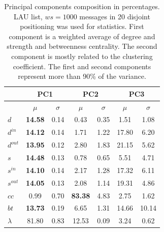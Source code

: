 \documentclass[%
 aip,
 jmp,%
 amsmath,amssymb,
 reprint,%
]{revtex4-1}
\begin{document}
\begin{table}[!h]
  \centering
  \caption{Principal components composition in percentages. LAU list, $ws=1000$ messages in 20 disjoint positioning was used for statistics. First component is a weighted average of degree and strength and betweenness centrality. The second component is mostly related to the  clustering coefficient. The first and second components represent more than 90\% of the variance.}
  \begin{tabular}{|l|c|c| c|c| c|c|}\hline
 & \multicolumn{2}{c|}{PC1} & \multicolumn{2}{c|}{PC2} & \multicolumn{2}{c|}{PC3}  \\\hline
       & $\mu$ & $\sigma$ & $\mu$ & $\sigma$ & $\mu$ & $\sigma$  \\\hline
$d$       & {\bf 14.58} & 0.14 & 0.43  & 0.35 & 1.51  & 1.08 \\
$d^{in}$  & {\bf 14.12} & 0.14 & 1.71  & 1.22 & 17.80 & 6.20 \\
$d^{out}$ & {\bf 13.95} & 0.12 & 2.80  & 1.83 & 21.15 & 5.62 \\
$s$       & {\bf 14.48} & 0.13 & 0.78  & 0.65 & 5.51  & 4.71 \\ 
$s^{in}$  & {\bf 14.10} & 0.14 & 2.17  & 1.28 & 17.32 & 6.11 \\ 
$s^{out}$ & {\bf 14.05} & 0.13 & 2.08  & 1.14 & 19.31 & 4.86 \\ \hline
$cc$      & 0.99        & 0.70 & {\bf 83.38} & 4.83 & 2.75  & 1.62 \\ 
$bt$      & {\bf 13.73} & 0.19 & 6.65  & 1.31 & 14.66 & 10.14 \\ \hline
$\lambda$ & 81.80 & 0.83 & 12.53 & 0.09  & 3.24 & 0.62 \\ \hline
  \end{tabular}
  \label{compPCA}
\end{table}
\end{document}
